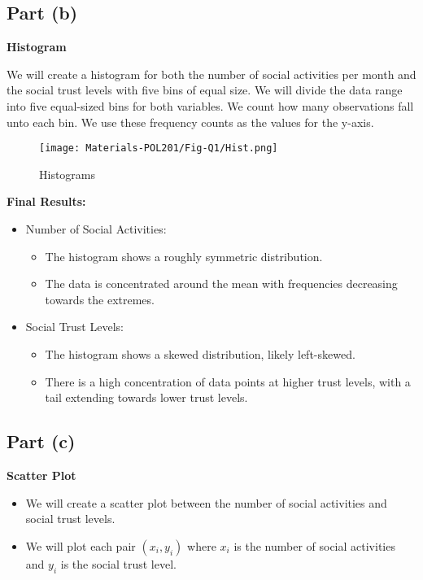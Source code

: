 \documentclass{article}
\begin{document}
\subsection*{Part (b)}

\textbf{Histogram}

We will create a histogram for both the number of social activities per month and the social trust levels with five bins of equal size.
We will divide the data range into five equal-sized bins for both variables. We count how many observations fall unto each bin. We use these frequency counts as the values for the y-axis.

\begin{figure}[H]
    \centering
    \texttt{[image: Materials-POL201/Fig-Q1/Hist.png]}
    \caption{Histograms }
    \label{fig:fig1}
\end{figure}

\textbf{Final Results:}
\begin{itemize}
    \item Number of Social Activities:
    \begin{itemize}
        \item The histogram shows a roughly symmetric distribution.
        \item The data is concentrated around the mean with frequencies decreasing towards the extremes.
    \end{itemize}
    \item Social Trust Levels:
    \begin{itemize}
        \item The histogram shows a skewed distribution, likely left-skewed.
        \item There is a high concentration of data points at higher trust levels, with a tail extending towards lower trust levels.
    \end{itemize}
\end{itemize}

\subsection*{Part (c)}

\textbf{Scatter Plot}

\begin{itemize}
    \item We will create a scatter plot between the number of social activities and social trust levels.
    \item We will plot each pair $(x_i, y_i)$ where $x_i$ is the number of social activities and $y_i$ is the social trust level.
\end{itemize}
\end{document}

